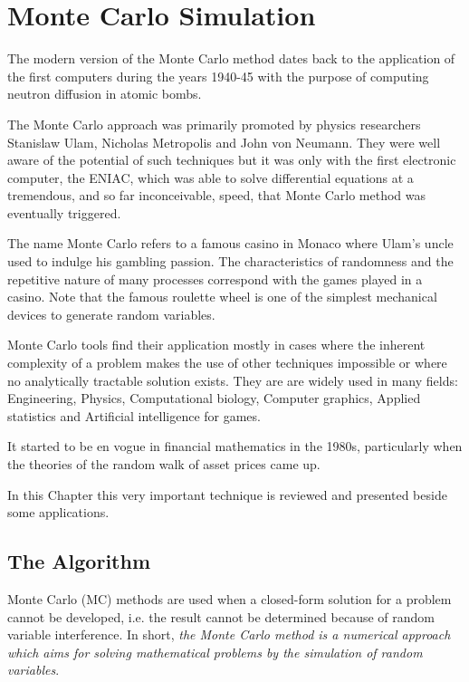 \chapter{Monte Carlo Simulation}
\label{cap:montecarlo}

The modern version of the Monte Carlo method dates back to the application of the first computers during the years 1940-45 with the purpose of computing neutron diffusion in atomic bombs.

The Monte Carlo approach was primarily promoted by physics researchers Stanislaw Ulam, Nicholas Metropolis and John von Neumann. They were well aware of the potential of such techniques but it was only with the first electronic computer, the ENIAC, which was able to solve differential equations at a tremendous, and so far inconceivable, speed, that Monte Carlo method was eventually triggered.

The name Monte Carlo refers to a famous casino in Monaco where Ulam's uncle used to indulge his gambling passion. 
The characteristics of randomness and the repetitive nature of many processes correspond with the games played in a casino. Note that the famous roulette wheel is one of the simplest mechanical devices to generate random variables.

Monte Carlo tools find their application mostly in cases where the inherent complexity of a problem makes the use of other techniques impossible or where no analytically tractable solution exists.
They are are widely used in many fields: Engineering, Physics, Computational biology, Computer graphics, Applied statistics and Artificial intelligence for games.

It started to be en vogue in financial mathematics in the 1980s, particularly when the theories of the random walk of asset prices came up.

In this Chapter this very important technique is reviewed and presented beside some applications.

\section{The Algorithm}
\label{whats-monte-carlo-simulation}

Monte Carlo (MC) methods are used when a closed-form solution for a problem cannot be developed, i.e. the result cannot be determined because of random variable interference.
In short, \emph{the Monte Carlo method is a numerical approach which aims for solving mathematical problems by the simulation of random variables}.

